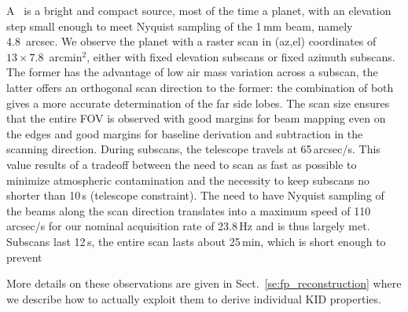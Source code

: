 A \bm\ is  a bright and compact
source, most of the time a planet, with
an elevation step small enough to meet Nyquist sampling of the 1\,mm beam,
namely 4.8~arcsec. We observe the planet with a raster scan in (az,el)
coordinates of $13\times7.8$~arcmin$^2$, either with fixed elevation subscans or
fixed azimuth subscans. The former has the advantage of low air mass variation
across a subscan, the latter offers an orthogonal scan direction to the former:
the combination of both gives a more accurate determination of the far side
lobes. The scan size ensures that the entire FOV is observed with good margins
for beam mapping even on the edges and good margins for baseline derivation and
subtraction in the scanning direction. During subscans, the telescope travels at
65\,arcsec/s. This value results of a tradeoff between the need to scan as
fast as possible to minimize atmospheric contamination and the
necessity to keep subscans no shorter than 10\,s (telescope
constraint). The need to have Nyquist sampling of
the beams along the scan direction translates into a maximum speed of 110\,arcsec/s
for our nominal acquisition rate of 23.8\,Hz and is thus largely met. Subscans
last 12\,s, the entire scan lasts about 25\,min, which is short enough to prevent


More details on these observations are given in Sect.~\ref{se:fp_reconstruction}
where we describe how to actually exploit them to derive individual KID
properties.
